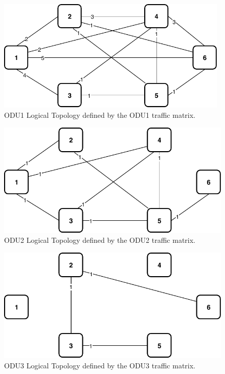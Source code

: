 \begin{figure}[h!]
\centering
\includegraphics[width=11cm]{sdf/ilp/opaque_protection/figures/logical_topology_ODU1_low}
\caption{ODU1 Logical Topology defined by the ODU1 traffic matrix.}
\label{logical_ODU1_protectionlow}
\end{figure}
\newpage
\begin{figure}[h!]
\centering
\includegraphics[width=12cm]{sdf/ilp/opaque_protection/figures/logical_topology_ODU2_low}
\caption{ODU2 Logical Topology defined by the ODU2 traffic matrix.}
\label{logical_ODU2_protectionlow}
\end{figure}

\begin{figure}[h!]
\centering
\includegraphics[width=12cm]{sdf/ilp/opaque_protection/figures/logical_topology_ODU3_low}
\caption{ODU3 Logical Topology defined by the ODU3 traffic matrix.}
\label{logical_ODU3_protectionlow}
\end{figure}

